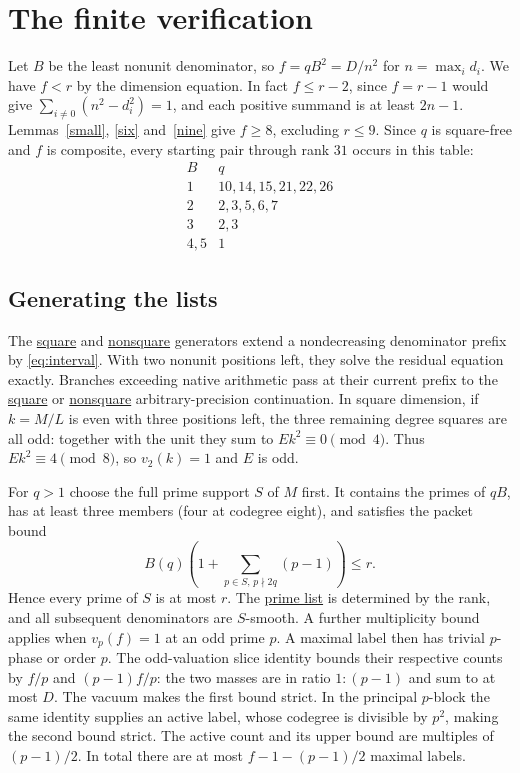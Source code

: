 \documentclass[11pt]{amsart}
\numberwithin{equation}{section}
\newcommand{\supfile}[2]{\href{https://github.com/sebastienpalcoux/WGT-fusion-categories/blob/433d1c45795202991f1693e00d9770e4cccf05f6/papers/rank-bound-supplement/#1}{#2}}
\begin{document}
\section{The finite verification}\label{sec:verify}
Let $B$ be the least nonunit denominator, so $f=qB^2=D/n^2$ for
$n=\max_i d_i$. We have $f<r$ by the dimension equation. In fact
$f\le r-2$, since $f=r-1$ would give
$\sum_{i\ne0}(n^2-d_i^2)=1$, and each positive summand is at least
$2n-1$. Lemmas~\ref{small}, \ref{six} and~\ref{nine} give $f\ge8$,
excluding $r\le9$. Since $q$ is square-free and $f$ is composite,
every starting pair through rank $31$ occurs in this table:
\[
\begin{array}{c|l}
 B & q \\ \hline
 1 &10,14,15,21,22,26\\
 2 &2,3,5,6,7\\
 3 &2,3\\
 4,5 &1
\end{array}
\]

\subsection{Generating the lists}
The \supfile{square.cpp}{square} and \supfile{nonsquare.cpp}{nonsquare}
generators extend a nondecreasing denominator prefix by
\eqref{eq:interval}. With two nonunit positions left, they solve the
residual equation exactly. Branches exceeding native arithmetic pass
at their current prefix to the \supfile{square_exact.py}{square} or
\supfile{nonsquare_exact.py}{nonsquare} arbitrary-precision continuation.
In square dimension, if $k=M/L$ is even with three positions left,
the three remaining degree squares are all odd: together with the unit
they sum to $Ek^2\equiv0\pmod4$. Thus $Ek^2\equiv4\pmod8$,
so $v_2(k)=1$ and $E$ is odd.

For $q>1$ choose the full prime support $S$ of $M$ first. It contains
the primes of $qB$, has at least three members (four at codegree eight),
and satisfies the packet bound
\[
 B(q)\left(1+\sum_{p\in S,\,p\nmid2q}(p-1)\right)\le r.
\]
Hence every prime of $S$ is at most $r$. The
\supfile{primes.py}{prime list} is determined by the rank, and all
subsequent denominators are $S$-smooth. A further multiplicity bound applies when $v_p(f)=1$ at
an odd prime $p$. A maximal label then has trivial $p$-phase or order $p$.
The odd-valuation slice identity bounds their respective counts by $f/p$
and $(p-1)f/p$: the two masses are in ratio $1:(p-1)$ and sum to at most $D$.
The vacuum makes the first bound strict. In the principal $p$-block the
same identity supplies an active label, whose codegree is divisible by
$p^2$, making the second bound strict. The active count and its upper
bound are multiples of $(p-1)/2$. In total there are at most
$f-1-(p-1)/2$ maximal labels.
\end{document}
